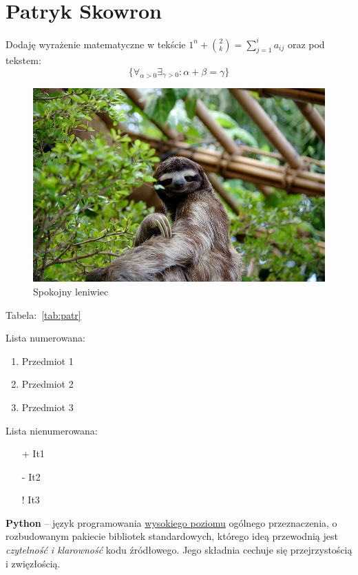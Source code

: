 \section{Patryk Skowron}

Dodaję wyrażenie matematyczne w tekście
$1^n+ {2 \choose k}=\sum_{j=1}^{i} a_{ij}$
oraz pod tekstem:
\[\{\forall_{\alpha>0} \exists_{\gamma>0} : \alpha+\beta=\gamma\}\]

\begin{figure}[htbp]
    \centering
    \includegraphics[scale=0.3]{pictures/leniwiec.jpg}
    \caption{Spokojny leniwiec}
    \label{fig:ln}
\end{figure}

Tabela:~\ref{tab:patr}


\newline

Lista numerowana:
\begin{enumerate}
    \item Przedmiot 1
    \item Przedmiot 2
    \item Przedmiot 3
\end{enumerate}

\newpage

Lista nienumerowana:
\begin{itemize}
    \item[+] It1
    \item[-] It2
    \item[!] It3
\end{itemize}

\textbf{Python} – język programowania \underline{wysokiego poziomu} ogólnego przeznaczenia, o rozbudowanym pakiecie bibliotek standardowych, którego ideą przewodnią jest \emph{czytelność i klarowność} kodu źródłowego. Jego składnia cechuje się przejrzystością i zwięzłością.

